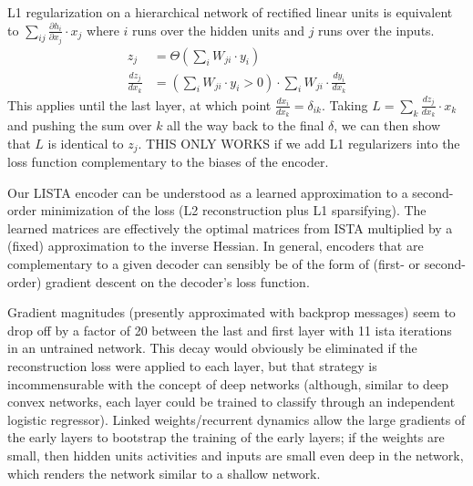 L1 regularization on a hierarchical network of rectified linear units is equivalent to $\sum_{ij} \frac{\partial h_i}{\partial x_j} \cdot x_j$ where $i$ runs over the hidden units and $j$ runs over the inputs.  
\begin{align*}
z_j &= \Theta\left(\sum_i W_{ji} \cdot y_i \right) \\
\frac{d z_j}{d x_k} &= \left( \sum_i W_{ji} \cdot y_i > 0 \right) \cdot \sum_i W_{ji} \cdot \frac{d y_i}{d x_k} 
\end{align*}
This applies until the last layer, at which point $\frac{d x_i}{d x_k} = \delta_{ik}$.  Taking $L = \sum_k \frac{d z_j}{d x_k} \cdot x_k$ and pushing the sum over $k$ all the way back to the final $\delta$, we can then show that $L$ is identical to $z_j$.  THIS ONLY WORKS if we add L1 regularizers into the loss function complementary to the biases of the encoder.

Our LISTA encoder can be understood as a learned approximation to a second-order minimization of the loss (L2 reconstruction plus L1 sparsifying).  The learned matrices are effectively the optimal matrices from ISTA multiplied by a (fixed) approximation to the inverse Hessian.  In general, encoders that are complementary to a given decoder can sensibly be of the form of (first- or second-order) gradient descent on the decoder's loss function. 

Gradient magnitudes (presently approximated with backprop messages) seem to drop off by a factor of 20 between the last and first layer with 11 ista iterations in an untrained network.  This decay would obviously be eliminated if the reconstruction loss were applied to each layer, but that strategy is incommensurable with the concept of deep networks (although, similar to deep convex networks, each layer could be trained to classify through an independent logistic regressor).  Linked weights/recurrent dynamics allow the large gradients of the early layers to bootstrap the training of the early layers; if the weights are small, then hidden units activities and inputs are small even deep in the network, which renders the network similar to a shallow network.

